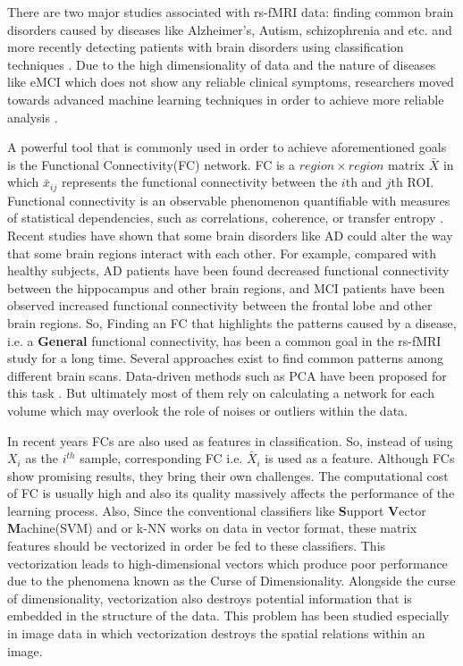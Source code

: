 \documentclass[journal]{IEEEtran}
\begin{document}
      
	There are two major studies associated with rs-fMRI data: finding common brain disorders caused by diseases like Alzheimer's, Autism, schizophrenia and etc. and more recently detecting patients with brain disorders using classification techniques \cite{r35,r36}. Due to the high dimensionality of data and the nature of diseases like eMCI which does not show any reliable clinical symptoms,
	researchers moved towards advanced machine learning techniques in order to achieve more reliable analysis \cite{r37}.
	
	A powerful tool that is commonly used in order to achieve aforementioned goals is the Functional Connectivity(FC) network.  FC is a $region \times region$ matrix $\bar{X}$ in which $\bar{x}_{ij}$ represents the functional connectivity between the $i$th and $j$th ROI. Functional connectivity is an observable
	phenomenon quantifiable with measures of statistical dependencies, such as correlations, coherence, or transfer entropy \cite{r38}.  Recent studies have shown that some brain disorders like AD could alter the way that some brain regions interact with each other. For example, compared with healthy subjects, AD patients have been found decreased functional connectivity between the hippocampus and other brain regions, and MCI patients have been observed increased functional connectivity between the frontal lobe and other brain regions\cite{r04}.
	So, Finding an FC that highlights the patterns caused by a disease, i.e. a \textbf{General} functional connectivity, has been a common goal in the rs-fMRI study for a long time. Several approaches exist to find common patterns among different brain scans. Data-driven methods such as PCA have been proposed for this task \cite{r55}. But ultimately most of them rely on calculating a network for each volume which may overlook the role of noises or outliers within the data\cite{r54}. 
	
	In recent years FCs are also used as features in classification. 
	So, instead of using $X_i$ as the $i^{th}$ sample,  corresponding  FC i.e. $\bar{X}_i$ is used as a feature. Although FCs show promising results, they bring their own challenges.  The computational cost of FC is usually high and also its quality massively affects the performance of the learning process. Also, Since the conventional classifiers like \textbf{S}upport \textbf{V}ector \textbf{M}achine(SVM) and or k-NN works on data in vector format, these matrix features should be vectorized in order be fed to these classifiers.
	This vectorization leads to high-dimensional vectors which produce poor performance due to the phenomena known as the Curse of Dimensionality. Alongside the curse of dimensionality, vectorization also destroys potential information that is embedded in the structure of the data. 
	This problem has been studied especially in image data in which vectorization destroys the spatial relations within an image\cite{r60}.
	
\end{document}
